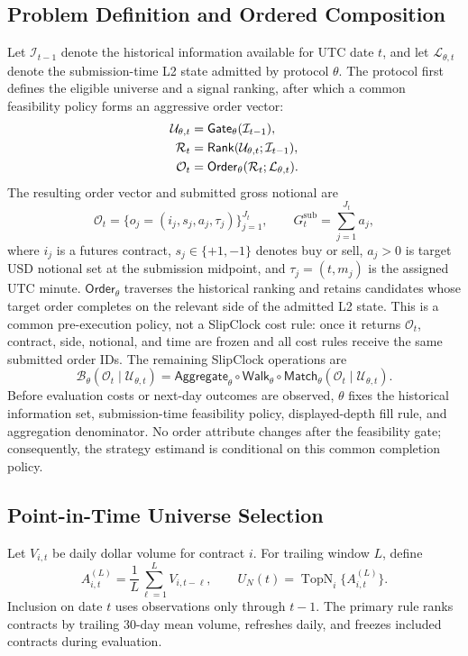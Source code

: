 \documentclass[sigconf]{acmart}
\begin{document}
\subsection{Problem Definition and Ordered Composition}
Let $\mathcal I_{t-1}$ denote the historical information available for UTC date $t$, and let $\mathcal L_{\theta,t}$ denote the submission-time L2 state admitted by protocol $\theta$. The protocol first defines the eligible universe and a signal ranking, after which a common feasibility policy forms an aggressive order vector:
\begin{align}
\mathcal U_{\theta,t}&=\mathsf{Gate}_{\theta}(\mathcal I_{t-1}),\notag\\
\mathcal R_t&=\mathsf{Rank}(\mathcal U_{\theta,t};\mathcal I_{t-1}),\label{eq:gate-rank-order}\\
\mathcal O_t&=\mathsf{Order}_{\theta}(\mathcal R_t;\mathcal L_{\theta,t}).\notag
\end{align}
The resulting order vector and submitted gross notional are
\begin{equation}
\mathcal O_t=\{o_j=(i_j,s_j,a_j,\tau_j)\}_{j=1}^{J_t},
\qquad G^{\mathrm{sub}}_t=\sum_{j=1}^{J_t}a_j,
\end{equation}
where $i_j$ is a futures contract, $s_j\in\{+1,-1\}$ denotes buy or sell, $a_j>0$ is target USD notional set at the submission midpoint, and $\tau_j=(t,m_j)$ is the assigned UTC minute. $\mathsf{Order}_{\theta}$ traverses the historical ranking and retains candidates whose target order completes on the relevant side of the admitted L2 state. This is a common pre-execution policy, not a SlipClock cost rule: once it returns $\mathcal O_t$, contract, side, notional, and time are frozen and all cost rules receive the same submitted order IDs. The remaining SlipClock operations are
\begin{equation}
\mathcal B_{\theta}(\mathcal O_t\mid\mathcal U_{\theta,t})
=\mathsf{Aggregate}_{\theta}\circ\mathsf{Walk}_{\theta}
\circ\mathsf{Match}_{\theta}(\mathcal O_t\mid\mathcal U_{\theta,t}).
\end{equation}
Before evaluation costs or next-day outcomes are observed, $\theta$ fixes the historical information set, submission-time feasibility policy, displayed-depth fill rule, and aggregation denominator. No order attribute changes after the feasibility gate; consequently, the strategy estimand is conditional on this common completion policy.

\subsection{Point-in-Time Universe Selection}
Let $V_{i,t}$ be daily dollar volume for contract $i$. For trailing window $L$, define
\begin{equation}
A_{i,t}^{(L)}=\frac{1}{L}\sum_{\ell=1}^{L}V_{i,t-\ell},
\qquad
U_N(t)=\operatorname{TopN}_{i}\{A_{i,t}^{(L)}\}.
\end{equation}
Inclusion on date $t$ uses observations only through $t-1$. The primary rule ranks contracts by trailing 30-day mean volume, refreshes daily, and freezes included contracts during evaluation.
\end{document}
